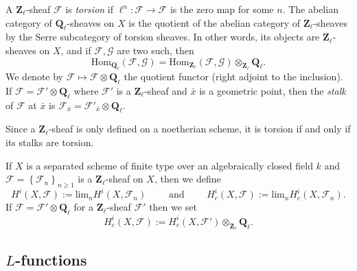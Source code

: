 \begin{definition} 
A $\mathbf{Z}_\ell$-sheaf $\mathcal{F}$ is \emph{torsion} if $\ell^n: \mathcal{F} \to \mathcal{F}$ is the zero map for some $n$. The abelian category of $\mathbf{Q}_\ell$-sheaves on $X$ is the quotient of the abelian category of $\mathbf{Z}_\ell$-sheaves by the Serre subcategory of torsion sheaves.  In other words, its objects are $\mathbf{Z}_\ell$-sheaves on $X$, and if $\mathcal{F}, \mathcal{G}$ are two such, then
$$
\text{Hom}_{\mathbf{Q}_\ell} \left(\mathcal{F}, \mathcal{G} \right) = \text{Hom}_{\mathbf{Z}_\ell} \left(\mathcal{F}, \mathcal{G}\right) \otimes_{\mathbf{Z}_\ell} \mathbf{Q}_\ell.
$$
We denote by $\mathcal{F} \mapsto \mathcal{F} \otimes \mathbf{Q}_\ell$ the quotient functor (right adjoint to the inclusion). If $\mathcal{F} = \mathcal{F}' \otimes \mathbf{Q}_\ell$ where $\mathcal{F}'$ is a $\mathbf{Z}_\ell$-sheaf and $\bar x$ is a geometric point, then the \emph{stalk} of $\mathcal{F}$ at $\bar x$ is $\mathcal{F}_{\bar x} = \mathcal{F}'_{\bar x} \otimes \mathbf{Q}_\ell$.
\end{definition}

\begin{remark}
Since a $\mathbf{Z}_\ell$-sheaf is only defined on a noetherian scheme, it is torsion if and only if its stalks are torsion. 
\end{remark}

\begin{definition} 
If $X$ is a separated scheme of finite type over an algebraically closed field $k$ and $\mathcal{F} = \left\{\mathcal{F}_n\right\}_{n\geq 1}$ is a $\mathbf{Z}_\ell$-sheaf on $X$, then we define
$$
H^i(X, \mathcal{F}) := \text{lim}_n H^i(X, \mathcal{F}_n)
\qquad\text{ and }\qquad
H_c^i(X, \mathcal{F}) := \text{lim}_n H_c^i(X, \mathcal{F}_n).
$$
If $\mathcal{F} = \mathcal{F}'\otimes \mathbf{Q}_\ell$ for a $\mathbf{Z}_\ell$-sheaf  $\mathcal{F}'$ then we set
$$
H_c^i(X ,\mathcal{F}) := H_c^i(X, \mathcal{F}')\otimes_{\mathbf{Z}_\ell}\mathbf{Q}_\ell.
$$
\end{definition}

\subsection{$L$-functions} 

